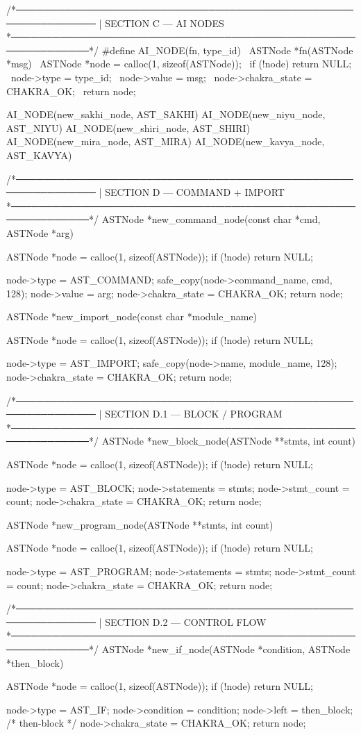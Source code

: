 \documentclass{article}
\begin{document}
/*──────────────────────────────────────────────────────────────
 | SECTION C — AI NODES
 *──────────────────────────────────────────────────────────────*/
#define AI_NODE(fn, type_id)                      \
ASTNode *fn(ASTNode *msg) {                       \
    ASTNode *node = calloc(1, sizeof(ASTNode));   \
    if (!node) return NULL;                       \
    node->type = type_id;                         \
    node->value = msg;                            \
    node->chakra_state = CHAKRA_OK;               \
    return node;                                  \
}

AI_NODE(new_sakhi_node, AST_SAKHI)
AI_NODE(new_niyu_node,  AST_NIYU)
AI_NODE(new_shiri_node, AST_SHIRI)
AI_NODE(new_mira_node,  AST_MIRA)
AI_NODE(new_kavya_node, AST_KAVYA)

/*──────────────────────────────────────────────────────────────
 | SECTION D — COMMAND + IMPORT
 *──────────────────────────────────────────────────────────────*/
ASTNode *new_command_node(const char *cmd, ASTNode *arg)
{
    ASTNode *node = calloc(1, sizeof(ASTNode));
    if (!node) return NULL;

    node->type = AST_COMMAND;
    safe_copy(node->command_name, cmd, 128);
    node->value = arg;
    node->chakra_state = CHAKRA_OK;
    return node;
}

ASTNode *new_import_node(const char *module_name)
{
    ASTNode *node = calloc(1, sizeof(ASTNode));
    if (!node) return NULL;

    node->type = AST_IMPORT;
    safe_copy(node->name, module_name, 128);
    node->chakra_state = CHAKRA_OK;
    return node;
}

/*──────────────────────────────────────────────────────────────
 | SECTION D.1 — BLOCK / PROGRAM
 *──────────────────────────────────────────────────────────────*/
ASTNode *new_block_node(ASTNode **stmts, int count)
{
    ASTNode *node = calloc(1, sizeof(ASTNode));
    if (!node) return NULL;

    node->type = AST_BLOCK;
    node->statements = stmts;
    node->stmt_count = count;
    node->chakra_state = CHAKRA_OK;
    return node;
}

ASTNode *new_program_node(ASTNode **stmts, int count)
{
    ASTNode *node = calloc(1, sizeof(ASTNode));
    if (!node) return NULL;

    node->type = AST_PROGRAM;
    node->statements = stmts;
    node->stmt_count = count;
    node->chakra_state = CHAKRA_OK;
    return node;
}

/*──────────────────────────────────────────────────────────────
 | SECTION D.2 — CONTROL FLOW
 *──────────────────────────────────────────────────────────────*/
ASTNode *new_if_node(ASTNode *condition, ASTNode *then_block)
{
    ASTNode *node = calloc(1, sizeof(ASTNode));
    if (!node) return NULL;

    node->type = AST_IF;
    node->condition = condition;
    node->left = then_block;     /* then-block */
    node->chakra_state = CHAKRA_OK;
    return node;
}
\end{document}
